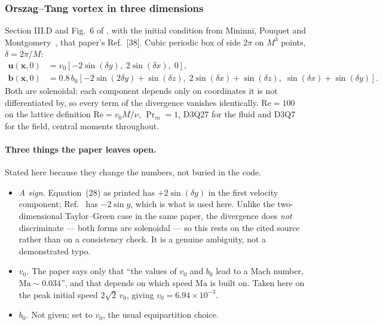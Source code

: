 \documentclass[11pt,a4paper]{article}
\newcommand{\uu}{\bm{u}}
\newcommand{\bb}{\bm{b}}
\newcommand{\xx}{\bm{x}}
\newcommand{\e}[1]{\times 10^{#1}}
\begin{document}
\subsubsection{Orszag--Tang vortex in three dimensions}
\label{sec:ot3d}

Section III.D and Fig.~6 of \cite{derosis2017pre}, with the initial condition
from Mininni, Pouquet and Montgomery~\cite{mininni2006}, that paper's Ref.~[38].
Cubic periodic box of side $2\pi$ on $M^3$ points, $\delta=2\pi/M$:
\begin{align}
  \uu(\xx,0) &= v_0\left[-2\sin(\delta y),\; 2\sin(\delta x),\; 0\right], \\
  \bb(\xx,0) &= 0.8\,b_0\left[-2\sin(2\delta y)+\sin(\delta z),\;
                              2\sin(\delta x)+\sin(\delta z),\;
                              \sin(\delta x)+\sin(\delta y)\right].
\end{align}
Both are solenoidal: each component depends only on coordinates it is not
differentiated by, so every term of the divergence vanishes identically.
$\mathrm{Re}=100$ on the lattice definition $\mathrm{Re}=v_0M/\nu$, $\Pr_m=1$,
D3Q27 for the fluid and D3Q7 for the field, central moments throughout.

\paragraph{Three things the paper leaves open.} Stated here because they change
the numbers, not buried in the code.
\begin{itemize}[leftmargin=1.4em,itemsep=2pt]
\item \emph{A sign.} Equation~(28) as printed has $+2\sin(\delta y)$ in the first
      velocity component; Ref.~\cite{mininni2006} has $-2\sin y$, which is what
      is used here. Unlike the two-dimensional Taylor--Green case in the same
      paper, the divergence does \emph{not} discriminate --- both forms are
      solenoidal --- so this rests on the cited source rather than on a
      consistency check. It is a genuine ambiguity, not a demonstrated typo.
\item \emph{$v_0$.} The paper says only that ``the values of $v_0$ and $b_0$ lead
      to a Mach number, $\mathrm{Ma}\sim0.034$'', and that depends on which speed
      $\mathrm{Ma}$ is built on. Taken here on the peak initial speed
      $2\sqrt2\,v_0$, giving $v_0=6.94\e{-3}$.
\item \emph{$b_0$.} Not given; set to $v_0$, the usual equipartition choice.
\end{itemize}
\end{document}

